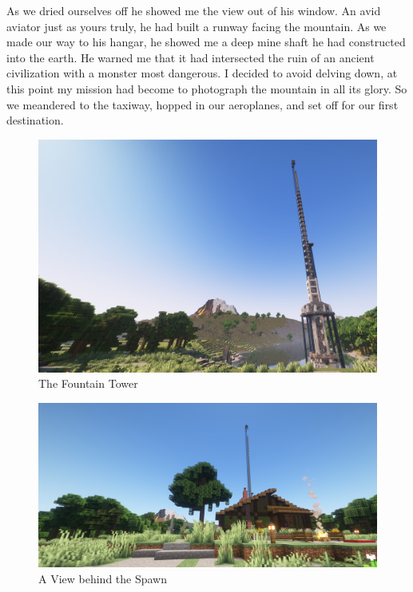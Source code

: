 As we dried ourselves off he showed me the view out of his window. An avid aviator just as yours truly, he had built a runway facing the mountain. As we made our way to his hangar, he showed me a deep mine shaft he had constructed into the earth. He warned me that it had intersected the ruin of an ancient civilization with a monster most dangerous. I decided to avoid delving down, at this point my mission had become to photograph the mountain in all its glory. So we meandered to the taxiway, hopped in our aeroplanes, and set off for our first destination.

\begin{figure}[H]
	\centering
	\includegraphics[width=\linewidth]{The Tower.png}
	\caption{The Fountain Tower}
\end{figure}

\begin{figure}[H]
	\centering
	\includegraphics[width=\linewidth]{From behind spawn.png}
	\caption[]{A View behind the Spawn}
\end{figure}

